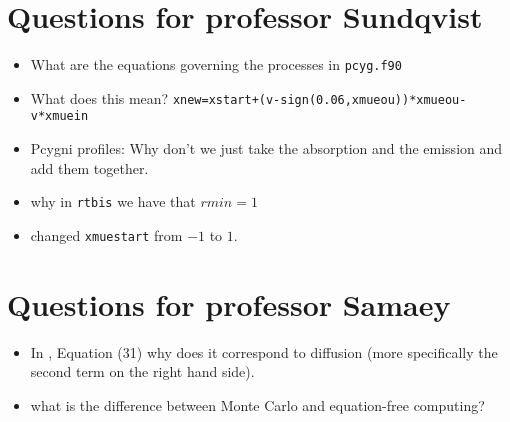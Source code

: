 \documentclass[../main/main.tex]{subfiles}
\begin{document}
\section{Questions for professor Sundqvist}
\begin{itemize}
\item What are the equations governing the processes in \texttt{pcyg.f90} 

\item What does this mean? \texttt{xnew=xstart+(v-sign(0.06,xmueou))*xmueou-v*xmuein}

\item Pcygni profiles: Why don't we just take the absorption and the emission and add them together.

\item why in \texttt{rtbis} we have that $rmin = 1$

\item changed \texttt{xmuestart} from $-1$ to $1$.

\end{itemize}

\section{Questions for professor Samaey}
\begin{itemize}
\item In \cite{Dimarco2018}, Equation (31) why does it correspond to diffusion (more specifically the second term on the right hand side).
\item what is the difference between Monte Carlo and equation-free computing?
\end{itemize}

\newpage
\end{document}
